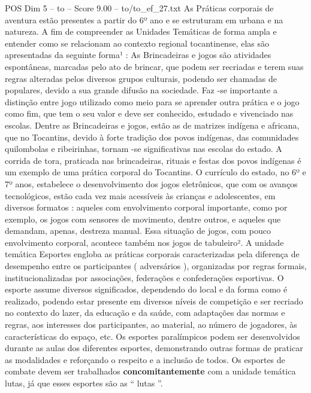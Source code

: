\begin{textsample}{POS Dim 5 – to – Score 9.00 – to/to\_ef\_27.txt}
As Práticas corporais de aventura estão presentes a partir do 6º ano e se estruturam em urbana e na natureza.
A fim de compreender as Unidades Temáticas de forma ampla e entender como se relacionam ao contexto regional tocantinense, elas são apresentadas da seguinte forma¹ : As Brincadeiras e jogos são atividades espontâneas, marcadas pelo ato de brincar, que podem ser recriadas e terem suas regras alteradas pelos diversos grupos culturais, podendo ser chamadas de populares, devido a sua grande difusão na sociedade.
Faz -se importante a distinção entre jogo utilizado como meio para se aprender outra prática e o jogo como fim, que tem o seu valor e deve ser conhecido, estudado e vivenciado nas escolas.
Dentre as Brincadeiras e jogos, estão as de matrizes indígena e africana, que no Tocantins, devido à forte tradição dos povos indígenas, das comunidades quilombolas e ribeirinhas, tornam -se significativas nas escolas do estado.
A corrida de tora, praticada nas brincadeiras, rituais e festas dos povos indígenas é um exemplo de uma prática corporal do Tocantins.
O currículo do estado, no 6º e 7º anos, estabelece o desenvolvimento dos jogos eletrônicos, que com os avanços tecnológicos, estão cada vez mais acessíveis às crianças e adolescentes, em diversos formatos : aqueles com envolvimento corporal importante, como por exemplo, os jogos com sensores de movimento, dentre outros, e aqueles que demandam, apenas, destreza manual.
Essa situação de jogos, com pouco envolvimento corporal, acontece também nos jogos de tabuleiro².
A unidade temática Esportes engloba as práticas corporais caracterizadas pela diferença de desempenho entre os participantes ( adversários ), organizadas por regras formais, institucionalizadas por associações, federações e confederações esportivas.
O esporte assume diversos significados, dependendo do local e da forma como é realizado, podendo estar presente em diversos níveis de competição e ser recriado no contexto do lazer, da educação e da saúde, com adaptações das normas e regras, aos interesses dos participantes, ao material, ao número de jogadores, às características do espaço, etc.
Os esportes paralímpicos podem ser desenvolvidos durante as aulas dos diferentes esportes, demonstrando outras formas de praticar as modalidades e reforçando o respeito e a inclusão de todos.
Os esportes de combate devem ser trabalhados \textbf{concomitantemente} com a unidade temática lutas, já que esses esportes são as “ lutas ”.

\end{textsample}
